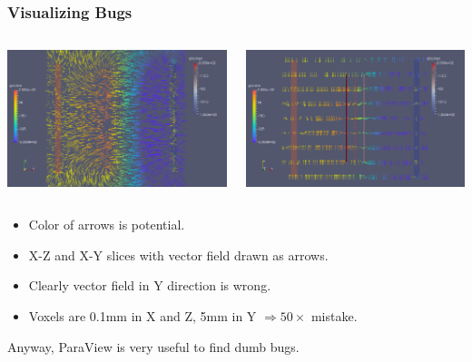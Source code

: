 \documentclass[xcolor=dvipsnames]{beamer}
\begin{document}
\begin{frame}
  \frametitle{Visualizing Bugs}
  \begin{columns}
    \begin{column}{0.5\textwidth}
      \includegraphics[width=\textwidth]{twodee-fine-arrows-plan.png}      
    \end{column}
    \begin{column}{0.5\textwidth}
      \includegraphics[width=\textwidth]{twodee-fine-arrows-side.png}      
    \end{column}
  \end{columns}
  \footnotesize
  \begin{itemize}
  \item Color of arrows is potential.
  \item X-Z and X-Y slices with vector field drawn as arrows.  
  \item Clearly vector field in Y direction is wrong.
  \item Voxels are 0.1mm in X and Z, 5mm in Y $\Rightarrow 50\times$ mistake.
  \end{itemize}
  Anyway, ParaView is very useful to find dumb bugs.
\end{frame}
\end{document}
